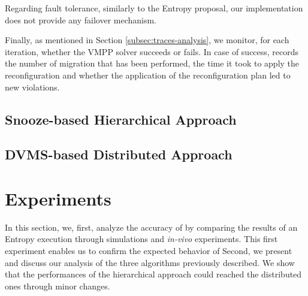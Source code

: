 Regarding fault tolerance, similarly to the Entropy proposal, our
implementation does not provide any failover mechanism.

Finally, as mentioned in Section \ref{subsec:traces-analysis}, we monitor, for each iteration,
whether the VMPP solver succeeds or fails. In case of success, \vmps
records the number of migration that has been performed, the time it
took to apply the reconfiguration and whether
the application of the reconfiguration plan led to new violations.

\subsection{Snooze-based Hierarchical Approach}
\label{subsec:snooze}


\subsection{DVMS-based Distributed Approach}
\label{subsec:dvms}


\section{Experiments}
\label{sec:experiments}
In this section, we, first, analyze the accuracy of \vmps by comparing
the  results of an Entropy execution through simulations and
\textit{in-vivo} experiments. This first experiment enables us to
confirm the expected behavior of \vmps Second, we present and discuss
our analysis of the three algorithms previously described.
We show that the performances of the hierarchical approach could
reached the distributed ones through minor changes.

